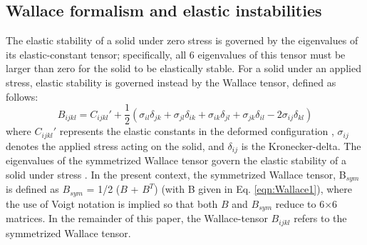 \documentclass[showpacs,aps,floatfix,prb,reprint,superscriptaddress]{revtex4-1}
\begin{document}




\subsection{Wallace formalism and elastic instabilities}
The elastic stability of a solid under zero stress is governed by the eigenvalues of its elastic-constant tensor; specifically, all 6 eigenvalues of this tensor must be larger than zero for the solid to be elastically stable. For a solid under an applied stress, elastic stability is governed instead by the Wallace tensor, defined as follows:
\begin{equation}
\label{eqn:Wallace1}
B_{ijkl} = C_{ijkl}' + \frac{1}{2} \left(\sigma_{il} \delta_{jk} + \sigma_{jl} \delta_{ik} + \sigma_{ik} \delta_{jl} + \sigma_{jk} \delta_{il} - 2\sigma_{ij} \delta_{kl} \right)
\end{equation}
where $C_{ijkl}'$ represents the elastic constants in the deformed configuration \cite{wallace1998thermodynamics,ray1988elastic,wang1993crystal}, $\sigma_{ij}$ denotes the applied stress acting on the solid, and $\delta_{ij}$ is the Kronecker-delta. The eigenvalues of the symmetrized Wallace tensor govern the elastic stability of a solid under stress \cite{wang1995mechanical}. In the present context, the symmetrized Wallace tensor, B$_{sym}$ is defined as  $B_{sym}$ = 1/2 ($B$ + $B^{T}$) (with B given in Eq. \ref{eqn:Wallace1}), where the use of Voigt notation is implied so that both $B$ and $B_{sym}$ reduce to 6$\times$6 matrices. In the remainder of this paper, the Wallace-tensor $B_{ijkl}$ refers to the symmetrized Wallace tensor. \\
\end{document}
